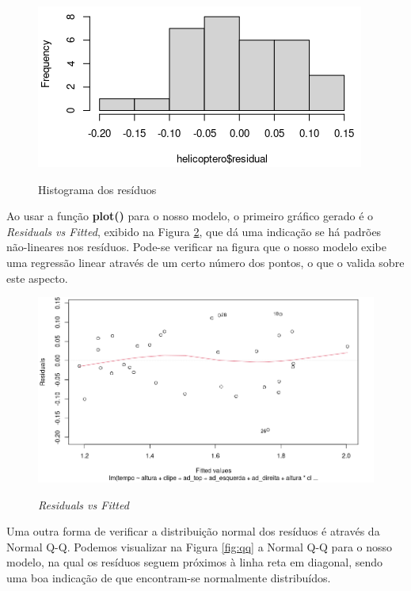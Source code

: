 \begin{figure}[H]
  \caption{Histograma dos resíduos}
  \center
  \includegraphics[scale=0.7]{images/hist_residuals.png}
  \label{fig:hist_residuals}
\end{figure}

Ao usar a função \textbf{plot()} para o nosso modelo, o primeiro gráfico gerado é o \textit{Residuals vs Fitted}, exibido na Figura \ref{fig:fitted}, que dá uma indicação se há padrões não-lineares nos resíduos. Pode-se verificar na figura que o nosso modelo exibe uma regressão linear através de um certo número dos pontos, o que o valida sobre este aspecto. 

\begin{figure}[H]
\caption{\textit{Residuals vs Fitted}}
\center 
\includegraphics[scale=0.48]{images/fitted.png}
\label{fig:fitted}
\end{figure}

Uma outra forma de verificar a distribuição normal dos resíduos é através da Normal Q-Q. Podemos visualizar na Figura \ref{fig:qq} a Normal Q-Q para o nosso modelo, na qual os resíduos seguem próximos à linha reta em diagonal, sendo uma boa indicação de que encontram-se normalmente distribuídos.

